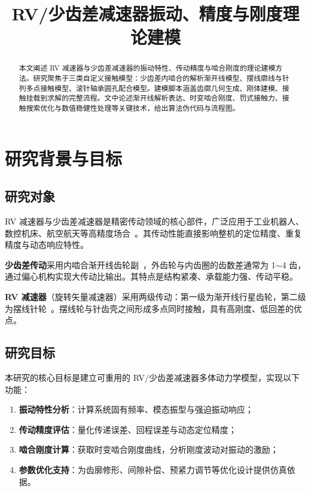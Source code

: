 \documentclass[12pt]{ctexart}
\title{\bfseries RV/少齿差减速器振动、精度与刚度理论建模}
\author{}
\date{}
\begin{document}
\maketitle

\begin{abstract}
本文阐述 RV 减速器与少齿差减速器的振动特性、传动精度与啮合刚度的理论建模方法。研究聚焦于三类自定义接触模型：少齿差内啮合的解析渐开线模型、摆线廓线与针列多点接触模型、滚针轴承圆孔配合模型。建模脚本涵盖齿廓几何生成、刚体建模、接触挂载到求解的完整流程。文中论述渐开线解析表达、时变啮合刚度、罚式接触力、接触搜索优化与数值稳健性处理等关键技术，给出算法伪代码与流程图。
\end{abstract}

\tableofcontents
\newpage

\section{研究背景与目标}

\subsection{研究对象}
RV 减速器与少齿差减速器是精密传动领域的核心部件，广泛应用于工业机器人、数控机床、航空航天等高精度场合~\cite{rvdynamic,rvfree}。其传动性能直接影响整机的定位精度、重复精度与动态响应特性。

\textbf{少齿差传动}采用内啮合渐开线齿轮副~\cite{litvin}，外齿轮与内齿圈的齿数差通常为 1$\sim$4 齿，通过偏心机构实现大传动比输出。其特点是结构紧凑、承载能力强、传动平稳。

\textbf{RV 减速器}（旋转矢量减速器）采用两级传动：第一级为渐开线行星齿轮，第二级为摆线针轮~\cite{cycloidmodel,cycloidltca}。摆线轮与针齿壳之间形成多点同时接触，具有高刚度、低回差的优点。

\subsection{研究目标}
本研究的核心目标是建立可重用的 RV/少齿差减速器多体动力学模型，实现以下功能：
\begin{enumerate}
  \item \textbf{振动特性分析}：计算系统固有频率、模态振型与强迫振动响应；
  \item \textbf{传动精度评估}：量化传递误差、回程误差与动态定位精度；
  \item \textbf{啮合刚度计算}：获取时变啮合刚度曲线，分析刚度波动对振动的激励；
  \item \textbf{参数优化支持}：为齿廓修形、间隙补偿、预紧力调节等优化设计提供仿真依据。
\end{enumerate}
\end{document}
